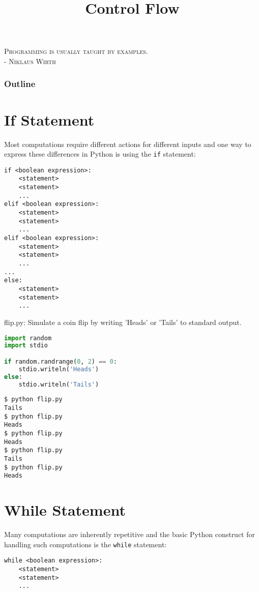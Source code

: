 \documentclass[8pt,a4paper,compress,handout]{beamer}
\title{Control Flow}
\date{}
\begin{document}
\begin{frame}
\begin{flushright}
\tiny \textsc{Programming is usually taught by examples. \\ - Niklaus Wirth}
\end{flushright}
\titlepage
\end{frame}

\begin{frame}
\frametitle{Outline}
\tableofcontents
\end{frame}

\section{If Statement}
\begin{frame}[fragile]
Most computations require different actions for different inputs and one way to express these differences in Python is using the \lstinline{if} statement:

\smallskip

\begin{lstlisting}[language={}]
if <boolean expression>:
    <statement>
    <statement>
    ...
elif <boolean expression>:
    <statement>
    <statement>
    ...
elif <boolean expression>:
    <statement>
    <statement>
    ...
...
else: 
    <statement>
    <statement>
    ...
\end{lstlisting}
\end{frame}

\begin{frame}[fragile]
\begin{framed}
\tiny flip.py: Simulate a coin flip by writing 'Heads' or 'Tails' to standard output.
\end{framed}

\begin{lstlisting}[language=Python]
import random
import stdio

if random.randrange(0, 2) == 0:
    stdio.writeln('Heads')
else:
    stdio.writeln('Tails')
\end{lstlisting}

\begin{lstlisting}[language={}]
$ python flip.py 
Tails
$ python flip.py 
Heads
$ python flip.py 
Heads
$ python flip.py 
Tails
$ python flip.py 
Heads
\end{lstlisting}
\end{frame}

\section{While Statement}
\begin{frame}[fragile]
Many computations are inherently repetitive and the basic Python construct for handling such computations is the \lstinline{while} statement:

\smallskip

\begin{lstlisting}[language={}]
while <boolean expression>:
    <statement>
    <statement>
    ...
\end{lstlisting}
\end{frame}
\end{document}
